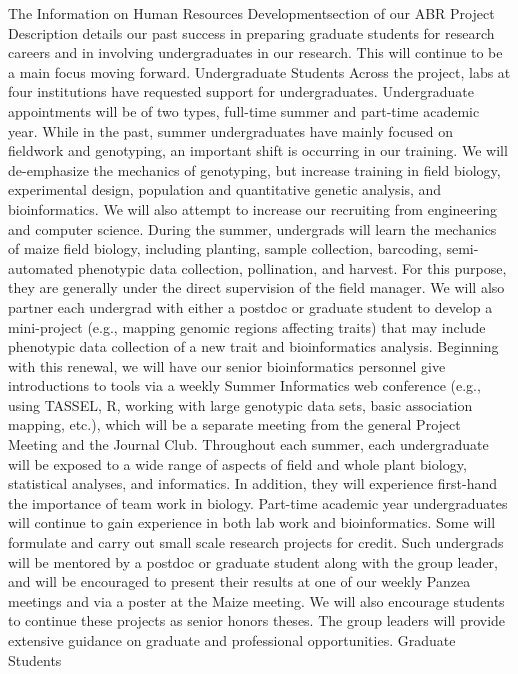 The Information on Human Resources Developmentsection of our ABR Project Description details our 
past success in preparing graduate students for research careers and in involving undergraduates in our 
research. This will continue to be a main focus moving forward.
Undergraduate Students
Across the project, labs at four institutions have requested support for undergraduates. Undergraduate 
appointments will be of two types, full-time summer and part-time academic year. While in the past, 
summer undergraduates have mainly focused on fieldwork and genotyping, an important shift is occurring 
in our training. We will de-emphasize the mechanics of genotyping, but increase training in field biology, 
experimental design, population and quantitative genetic analysis, and bioinformatics. We will also 
attempt to increase our recruiting from engineering and computer science. During the summer, 
undergrads will learn the mechanics of maize field biology, including planting, sample collection, 
barcoding, semi-automated phenotypic data collection, pollination, and harvest. For this purpose, they are 
generally under the direct supervision of the field manager. We will also partner each undergrad with 
either a postdoc or graduate student to develop a mini-project (e.g., mapping genomic regions affecting 
traits) that may include phenotypic data collection of a new trait and bioinformatics analysis. Beginning 
with this renewal, we will have our senior bioinformatics personnel give introductions to tools via a
weekly Summer Informatics web conference (e.g., using TASSEL, R, working with large genotypic data 
sets, basic association mapping, etc.), which will be a separate meeting from the general Project Meeting 
and the Journal Club. Throughout each summer, each undergraduate will be exposed to a wide range of 
aspects of field and whole plant biology, statistical analyses, and informatics. In addition, they will 
experience first-hand the importance of team work in biology.
Part-time academic year undergraduates will continue to gain experience in both lab work and 
bioinformatics. Some will formulate and carry out small scale research projects for credit. Such 
undergrads will be mentored by a postdoc or graduate student along with the group leader, and will be 
encouraged to present their results at one of our weekly Panzea meetings and via a poster at the Maize 
meeting. We will also encourage students to continue these projects as senior honors theses. The group 
leaders will provide extensive guidance on graduate and professional opportunities.
Graduate Students
